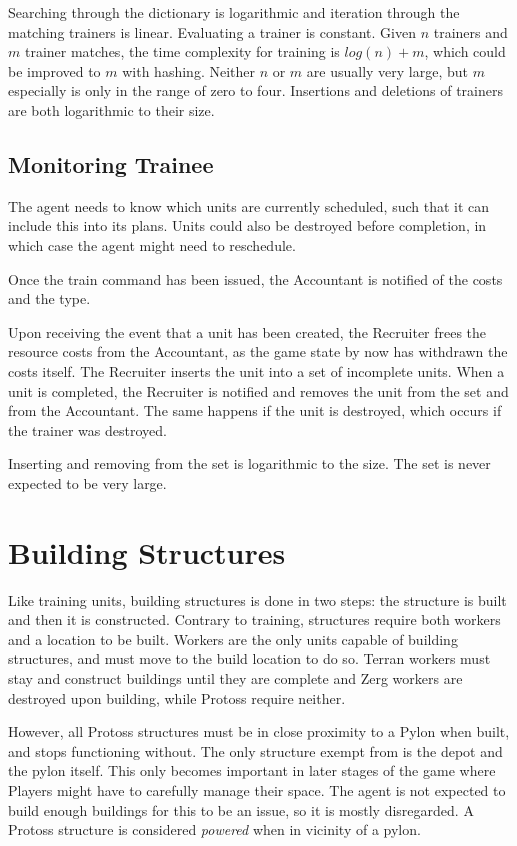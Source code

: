 	Searching through the dictionary is logarithmic and iteration through the matching trainers is linear. Evaluating a trainer is constant. Given $n$ trainers and $m$ trainer matches, the time complexity for training is $log(n) + m$, which could be improved to $m$ with hashing. Neither $n$ or $m$ are usually very large, but $m$ especially is only in the range of zero to four. Insertions and deletions of trainers are both logarithmic to their size.

	\subsection*{Monitoring Trainee}
	The agent needs to know which units are currently scheduled, such that it can include this into its plans. Units could also be destroyed before completion, in which case the agent might need to reschedule.
	
	Once the train command has been issued, the Accountant is notified of the costs and the type.
	
	Upon receiving the event that a unit has been created, the Recruiter frees the resource costs from the Accountant, as the game state by now has withdrawn the costs itself. The Recruiter inserts the unit into a set of incomplete units. When a unit is completed, the Recruiter is notified and removes the unit from the set and from the Accountant. The same happens if the unit is destroyed, which occurs if the trainer was destroyed.
	
	Inserting and removing from the set is logarithmic to the size. The set is never expected to be very large.

\section{Building Structures}
Like training units, building structures is done in two steps: the structure is built and then it is constructed. Contrary to training, structures require both workers and a location to be built. Workers are the only units capable of building structures, and must move to the build location to do so. Terran workers must stay and construct buildings until they are complete and Zerg workers are destroyed upon building, while Protoss require neither.

However, all Protoss structures must be in close proximity to a Pylon when built, and stops functioning without. The only structure exempt from is the depot and the pylon itself. This only becomes important in later stages of the game where Players might have to carefully manage their space. The agent is not expected to build enough buildings for this to be an issue, so it is mostly disregarded. A Protoss structure is considered \emph{powered} when in vicinity of a pylon.

